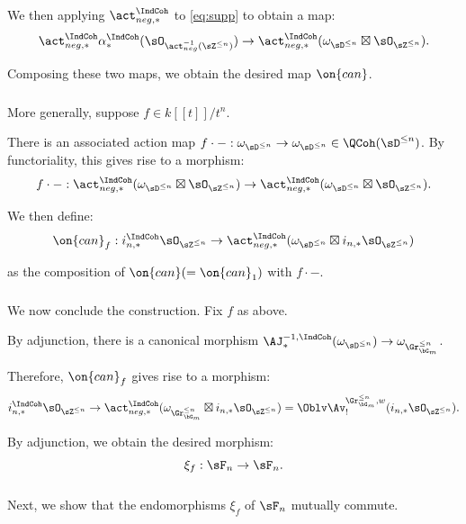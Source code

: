  We then applying $\act_{neg,*}^{\IndCoh}$
to \eqref{eq:supp} to obtain a map:
%
\[
\act_{neg,*}^{\IndCoh}\alpha_*^{\IndCoh}
(\sO_{\act_{neg}^{-1}(\sZ^{\leq n})}) \to
\act_{neg,*}^{\IndCoh}
(\omega_{\sD^{\leq n}} \boxtimes \sO_{\sZ^{\leq n}}).
\]

 Composing these two maps, we obtain
the desired map $\on{can}$.

\subsubsection{}

More generally, suppose $f \in k[[t]]/t^n$.

There is an associated action map
$f\cdot -:\omega_{\sD^{\leq n}} \to
\omega_{\sD^{\leq n}} \in \QCoh(\sD^{\leq n})$.
By functoriality, this gives rise to a morphism:
%
\[
f\cdot-:\act_{neg,*}^{\IndCoh}
(\omega_{\sD^{\leq n}} \boxtimes \sO_{\sZ^{\leq n}})
\to \act_{neg,*}^{\IndCoh}
(\omega_{\sD^{\leq n}} \boxtimes \sO_{\sZ^{\leq n}}).
\]

We then define:
%
\[
\on{can}_f:
i_{n,*}^{\IndCoh}\sO_{\sZ^{\leq n}} \to
\act_{neg,*}^{\IndCoh}
(\omega_{\sD^{\leq n}} \boxtimes
i_{n,*}\sO_{\sZ^{\leq n}})
\]

 as the composition of $\on{can} (= \on{can}_1)$
with $f\cdot-$.

\subsubsection{}

We now conclude the construction.
Fix $f$ as above.

By adjunction,
there is a canonical morphism
$\AJ_*^{-1,\IndCoh}(\omega_{\sD^{\leq n}}) \to
\omega_{\Gr_{\bG_m}^{\leq n}}$.

Therefore, $\on{can}_f$ gives rise to a morphism:
%
\[
i_{n,*}^{\IndCoh}\sO_{\sZ^{\leq n}} \to
\act_{neg,*}^{\IndCoh}
(\omega_{\Gr_{\bG_m}^{\leq n}} \boxtimes
i_{n,*}\sO_{\sZ^{\leq n}}) =
\Oblv\Av_!^{\Gr_{\bG_m}^{\leq n},w}
(i_{n,*}\sO_{\sZ^{\leq n}}).
\]

 By adjunction, we obtain the desired
morphism:
%
\[
\xi_f:\sF_n \to \sF_n.
\]

\subsubsection{}

Next, we show that the endomorphisms
$\xi_f$ of $\sF_n$ mutually commute.

